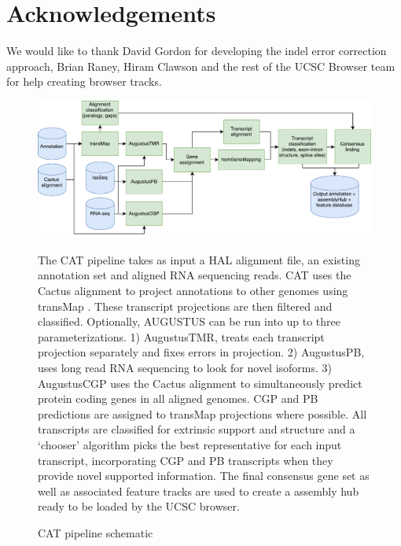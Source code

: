 \documentclass[fleqn,10pt]{wlscirep}
\begin{document}
\section*{Acknowledgements}
We would like to thank David Gordon for developing the indel error correction approach, Brian Raney, Hiram Clawson and the rest of the UCSC Browser team for help creating browser tracks.


\clearpage

\begin{figure}
\centering
\includegraphics[width=\textwidth,height=\textheight,keepaspectratio]{CAT.pdf}
\caption{CAT pipeline schematic}
The CAT pipeline takes as input a HAL alignment file, an existing annotation set and aligned RNA sequencing reads. CAT uses the Cactus alignment to project annotations to other genomes using transMap \cite{stanke2008using}. These transcript projections are then filtered and classified. Optionally, AUGUSTUS can be run into up to three parameterizations. 1) AugustusTMR, treats each transcript projection separately and fixes errors in projection. 2) AugustusPB, uses long read RNA sequencing to look for novel isoforms. 3) AugustusCGP \cite{konig2015simultaneous} uses the Cactus alignment to simultaneously predict protein coding genes in all aligned genomes. CGP and PB predictions are assigned to transMap projections where possible. All transcripts are classified for extrinsic support and structure and a ‘chooser’ algorithm picks the best representative for each input transcript, incorporating CGP and PB transcripts when they provide novel supported information. The final consensus gene set as well as associated feature tracks are used to create a assembly hub ready to be loaded by the UCSC browser.
\label{fig:fig1}
\end{figure}
\end{document}
